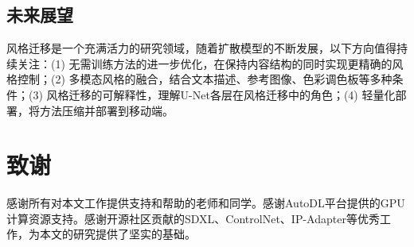 \documentclass[twocolumn,a4paper,11pt]{ctexart}
\begin{document}
\subsection{未来展望}

风格迁移是一个充满活力的研究领域，随着扩散模型的不断发展，以下方向值得持续关注：(1) 无需训练方法的进一步优化，在保持内容结构的同时实现更精确的风格控制；(2) 多模态风格的融合，结合文本描述、参考图像、色彩调色板等多种条件；(3) 风格迁移的可解释性，理解U-Net各层在风格迁移中的角色；(4) 轻量化部署，将方法压缩并部署到移动端。

\section*{致谢}
感谢所有对本文工作提供支持和帮助的老师和同学。感谢AutoDL平台提供的GPU计算资源支持。感谢开源社区贡献的SDXL、ControlNet、IP-Adapter等优秀工作，为本文的研究提供了坚实的基础。
\end{document}
